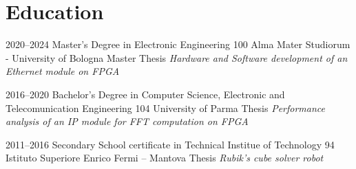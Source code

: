 \section{Education}
\cventry
  {2020--2024}
  {Master's Degree in Electronic Engineering}{}{}
  {100}
  {Alma Mater Studiorum - University of Bologna
  \newline{}
  Master Thesis \textit{Hardware and Software development of an Ethernet module on FPGA}}

\vspace{2mm}

\cventry
  {2016--2020}
  {Bachelor's Degree in Computer Science, Electronic and Telecomunication Engineering}{}{}
  {104}
  {University of Parma
  \newline{}
  Thesis \textit{Performance analysis of an IP module for FFT computation on FPGA}}

\vspace{2mm}

\cventry
  {2011--2016}
  {Secondary School certificate in Technical Institue of Technology}{}{}
  {94}
  {Istituto Superiore Enrico Fermi – Mantova
  \newline{}
  Thesis \textit{Rubik's cube solver robot}}
